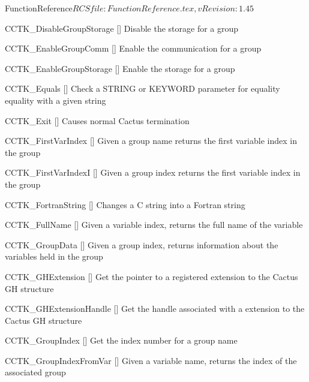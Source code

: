 \begin{cactuspart}{5}{FunctionReference}{$RCSfile: FunctionReference.tex,v $}{$Revision: 1.45 $}
\begin{Lentry}
\item[CCTK\_DisableGroupStorage]
  [\pageref{CCTK-DisableGroupStorage}]
  Disable the storage for a group

\item[CCTK\_EnableGroupComm]
  [\pageref{CCTK-EnableGroupComm}]
  Enable the communication for a group

\item[CCTK\_EnableGroupStorage]
  [\pageref{CCTK-EnableGroupStorage}]
  Enable the storage for a group

\item[CCTK\_Equals]
  [\pageref{CCTK-Equals}]
  Check a STRING or KEYWORD parameter for equality equality with a given string

\item[CCTK\_Exit]
  [\pageref{CCTK-Equals}]
  Causes normal Cactus termination

\item[CCTK\_FirstVarIndex]
  [\pageref{CCTK-FirstVarIndex}]
  Given a group name returns the first variable index in the group

\item[CCTK\_FirstVarIndexI]
  [\pageref{CCTK-FirstVarIndexI}]
  Given a group index returns the first variable index in the group

\item[CCTK\_FortranString]
  [\pageref{CCTK-FortranString}]
  Changes a C string into a Fortran string

\item[CCTK\_FullName]
  [\pageref{CCTK-FullName}]
  Given a variable index, returns the full name of the variable

\item[CCTK\_GroupData]
  [\pageref{CCTK-GroupData}]
  Given a group index, returns information about the variables held in the group

\item[CCTK\_GHExtension]
  [\pageref{CCTK-GHExtension}]
  Get the pointer to a registered extension to the Cactus GH structure

\item[CCTK\_GHExtensionHandle]
  [\pageref{CCTK-GHExtensionHandle}]
  Get the handle associated with a extension to the Cactus GH structure

\item[CCTK\_GroupIndex]
  [\pageref{CCTK-GroupIndex}]
  Get the index number for a group name

\item[CCTK\_GroupIndexFromVar]
  [\pageref{CCTK-GroupIndexFromVar}]
  Given a variable name, returns the index of the associated group


\end{Lentry}
\end{cactuspart}

